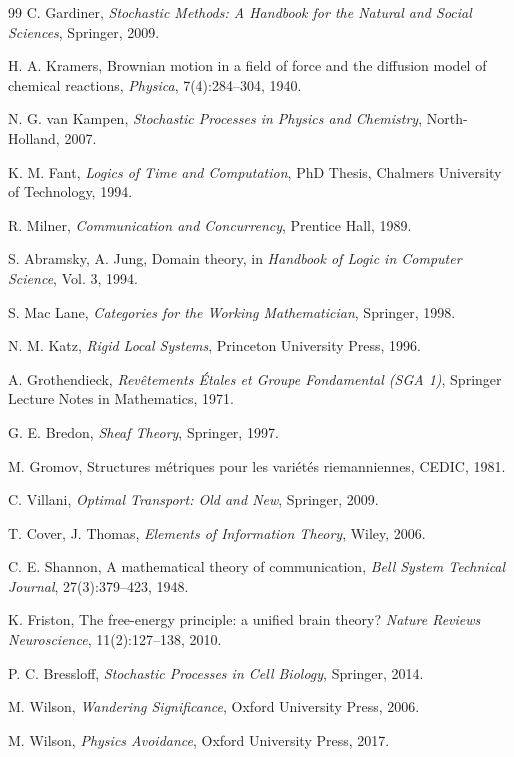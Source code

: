 \documentclass[12pt,a4paper]{article}
\begin{document}
\begin{thebibliography}{99}
C. Gardiner,
\newblock \emph{Stochastic Methods: A Handbook for the Natural and Social Sciences},
\newblock Springer, 2009.

H. A. Kramers,
\newblock Brownian motion in a field of force and the diffusion model of chemical reactions,
\newblock \emph{Physica}, 7(4):284--304, 1940.

N. G. van Kampen,
\newblock \emph{Stochastic Processes in Physics and Chemistry},
\newblock North-Holland, 2007.

K. M. Fant,
\newblock \emph{Logics of Time and Computation},
\newblock PhD Thesis, Chalmers University of Technology, 1994.

R. Milner,
\newblock \emph{Communication and Concurrency},
\newblock Prentice Hall, 1989.

S. Abramsky, A. Jung,
\newblock Domain theory,
\newblock in \emph{Handbook of Logic in Computer Science}, Vol. 3, 1994.

S. Mac Lane,
\newblock \emph{Categories for the Working Mathematician},
\newblock Springer, 1998.

N. M. Katz,
\newblock \emph{Rigid Local Systems},
\newblock Princeton University Press, 1996.

A. Grothendieck,
\newblock \emph{Revêtements Étales et Groupe Fondamental (SGA 1)},
\newblock Springer Lecture Notes in Mathematics, 1971.

G. E. Bredon,
\newblock \emph{Sheaf Theory},
\newblock Springer, 1997.

M. Gromov,
\newblock Structures métriques pour les variétés riemanniennes,
\newblock CEDIC, 1981.

C. Villani,
\newblock \emph{Optimal Transport: Old and New},
\newblock Springer, 2009.

T. Cover, J. Thomas,
\newblock \emph{Elements of Information Theory},
\newblock Wiley, 2006.

C. E. Shannon,
\newblock A mathematical theory of communication,
\newblock \emph{Bell System Technical Journal}, 27(3):379--423, 1948.

K. Friston,
\newblock The free-energy principle: a unified brain theory?
\newblock \emph{Nature Reviews Neuroscience}, 11(2):127--138, 2010.

P. C. Bressloff,
\newblock \emph{Stochastic Processes in Cell Biology},
\newblock Springer, 2014.

M. Wilson,
\newblock \emph{Wandering Significance},
\newblock Oxford University Press, 2006.

M. Wilson,
\newblock \emph{Physics Avoidance},
\newblock Oxford University Press, 2017.

\end{thebibliography}
\end{document}
